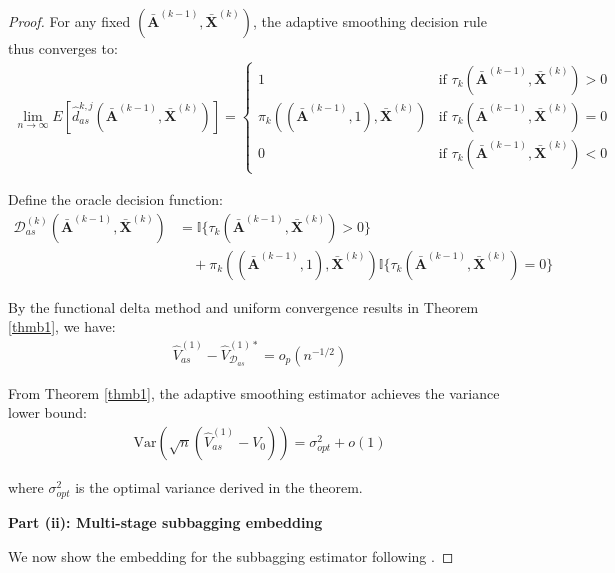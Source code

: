 \documentclass[11pt]{article}
\theoremstyle{referenceplain}
\theoremstyle{referencedefinition}
\theoremstyle{referenceremark}
\begin{document}
\begin{proof}

For any fixed $(\bar{\mathbf{A}}^{(k-1)}, \bar{\mathbf{X}}^{(k)})$, the adaptive smoothing decision rule thus converges to:
\begin{align}
\lim_{n \to \infty} E[\widehat{d}_{as}^{k,j}(\bar{\mathbf{A}}^{(k-1)}, \bar{\mathbf{X}}^{(k)})] = \begin{cases}
1 & \text{if } \tau_k(\bar{\mathbf{A}}^{(k-1)}, \bar{\mathbf{X}}^{(k)}) > 0 \\
\pi_k((\bar{\mathbf{A}}^{(k-1)}, 1), \bar{\mathbf{X}}^{(k)}) & \text{if } \tau_k(\bar{\mathbf{A}}^{(k-1)}, \bar{\mathbf{X}}^{(k)}) = 0 \\
0 & \text{if } \tau_k(\bar{\mathbf{A}}^{(k-1)}, \bar{\mathbf{X}}^{(k)}) < 0
\end{cases}
\end{align}


Define the oracle decision function:
\begin{align*}
\mathcal{D}_{as}^{(k)}(\bar{\mathbf{A}}^{(k-1)}, \bar{\mathbf{X}}^{(k)}) &= \mathbb{I}\{\tau_k(\bar{\mathbf{A}}^{(k-1)}, \bar{\mathbf{X}}^{(k)}) > 0\} \\
&\quad + \pi_k((\bar{\mathbf{A}}^{(k-1)}, 1), \bar{\mathbf{X}}^{(k)}) \mathbb{I}\{\tau_k(\bar{\mathbf{A}}^{(k-1)}, \bar{\mathbf{X}}^{(k)}) = 0\}
\end{align*}

By the functional delta method and uniform convergence results in Theorem \ref{thmb1}, we have:
\begin{align}\label{as-eal-embedding}
\widehat{V}_{as}^{(1)} - \widehat{V}_{\mathcal{D}_{as}}^{(1)*} = o_p(n^{-1/2})
\end{align}


From Theorem \ref{thmb1}, the adaptive smoothing estimator achieves the variance lower bound:
\begin{align}
\text{Var}(\sqrt{n}(\widehat{V}_{as}^{(1)} - V_0)) = \sigma_{opt}^2 + o(1)
\end{align}

where $\sigma_{opt}^2$ is the optimal variance derived in the theorem.

\textbf{Part (ii): Multi-stage subbagging embedding}

We now show the embedding for the subbagging estimator following \citet{shi2020breaking}.


\end{proof}
\end{document}

